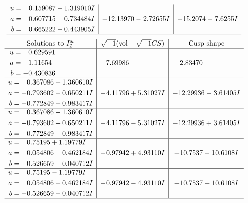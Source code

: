 \documentclass[1p]{elsarticle_modified}
\theoremstyle{definition}
\newcommand{\I}{\sqrt{-1}}
\begin{document}
$$\begin{array}{c|c|c}
\begin{aligned}
u &= \phantom{-}0.159087 - 1.319010 I \\
a &= \phantom{-}0.607715 + 0.734484 I \\
b &= \phantom{-}0.665222 - 0.443905 I\end{aligned}
 & -12.13970 - 2.72655 I & -15.2074 + 7.6255 I\\
 \hline 
 \end{array}$$\newpage$$\begin{array}{c|c|c}  
\text{Solutions to }I^u_{2}& \I (\text{vol} + \sqrt{-1}CS) & \text{Cusp shape}\\
 \hline 
\begin{aligned}
u &= \phantom{-}0.629591\phantom{ +0.000000I} \\
a &= -1.11654\phantom{ +0.000000I} \\
b &= -0.430836\phantom{ +0.000000I}\end{aligned}
 & -7.69986\phantom{ +0.000000I} & \phantom{-}2.83470\phantom{ +0.000000I} \\ \hline\begin{aligned}
u &= \phantom{-}0.367086 + 1.360610 I \\
a &= -0.793602 - 0.650211 I \\
b &= -0.772849 + 0.983417 I\end{aligned}
 & -4.11796 + 5.31027 I & -12.29936 - 3.61405 I \\ \hline\begin{aligned}
u &= \phantom{-}0.367086 - 1.360610 I \\
a &= -0.793602 + 0.650211 I \\
b &= -0.772849 - 0.983417 I\end{aligned}
 & -4.11796 - 5.31027 I & -12.29936 + 3.61405 I \\ \hline\begin{aligned}
u &= \phantom{-}0.75195 + 1.19779 I \\
a &= \phantom{-}0.054806 - 0.462184 I \\
b &= -0.526659 + 0.040712 I\end{aligned}
 & -0.97942 + 4.93110 I & -10.7537 - 10.6108 I \\ \hline\begin{aligned}
u &= \phantom{-}0.75195 - 1.19779 I \\
a &= \phantom{-}0.054806 + 0.462184 I \\
b &= -0.526659 - 0.040712 I\end{aligned}
 & -0.97942 - 4.93110 I & -10.7537 + 10.6108 I\\
 \hline 
 \end{array}$$\newpage
\end{document}
